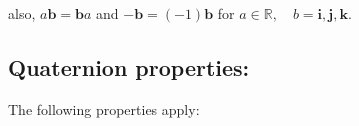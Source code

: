 \begin{table}[h!]
    \centering
    \renewcommand{\arraystretch}{1.25}
    \caption{Quaternion multiplication table}
    \label{tab:quat-mult}
\end{table}

also, $ a \mathbf{b} = \mathbf{b} a $ and
$ \mathbf{-b} = (-1) \mathbf{b} $ for $ a \in \mathbb{R}, \quad b = \mathbf{i}, \mathbf{j}, \mathbf{k} $.


\subsection{Quaternion properties:}

The following properties apply:

